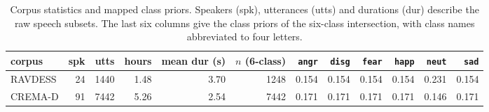 \begin{table}[!t]
  \centering
  \caption{Corpus statistics and mapped class priors. Speakers (spk), utterances (utts) and durations (dur) describe the raw speech subsets. The last six columns give the class priors of the six-class intersection, with class names abbreviated to four letters.}
  \label{tab:corpora}
  \begin{tabular}{lrrrrrrrrrrr}
    \toprule
    corpus & spk & utts & hours & mean dur (s) & $n$ (6-class) & \texttt{angr} & \texttt{disg} & \texttt{fear} & \texttt{happ} & \texttt{neut} & \texttt{sad} \\
    \midrule
    RAVDESS & 24 & 1440 & 1.48 & 3.70 & 1248 & 0.154 & 0.154 & 0.154 & 0.154 & 0.231 & 0.154 \\
    CREMA-D & 91 & 7442 & 5.26 & 2.54 & 7442 & 0.171 & 0.171 & 0.171 & 0.171 & 0.146 & 0.171 \\
    \bottomrule
  \end{tabular}
\end{table}
